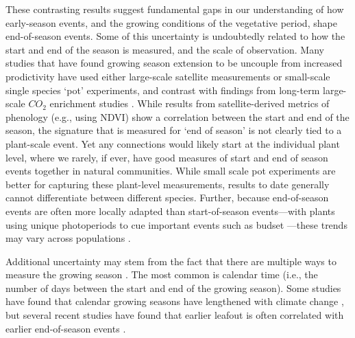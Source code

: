\documentclass{article}[12pt]
\begin{document}
These contrasting results suggest fundamental gaps in our understanding of how early-season events, and the growing conditions of the vegetative period, shape end-of-season events. Some of this uncertainty is undoubtedly related to how the start and end of the season is measured, and the scale of observation. Many studies that have found growing season extension to be uncouple from increased prodictivity have used either large-scale satellite measurements or small-scale single species `pot' experiments, and contrast with findings from long-term large-scale $CO_2$ enrichment studies \citep{norby2021comment}. While results from satellite-derived metrics of phenology (e.g., using NDVI) show a correlation between the start and end of the season, the signature that is measured for `end of season' is not clearly tied to a plant-scale event. Yet any connections would likely start at the individual plant level, where we rarely, if ever, have good measures of start and end of season events together in natural communities. While small scale pot experiments are better for capturing these plant-level measurements, results to date generally cannot differentiate between different species. Further, because end-of-season events are often more locally adapted than start-of-season events---with plants using unique photoperiods to cue important events such as budset \citep{bauerle2012photoperiodic,soolanayakanahally2013timing}---these trends may vary across populations \citep{aitken2016}.

Additional uncertainty may stem from the fact that there are multiple ways to measure the growing season \citep{Korner2023}. The most common is calendar time (i.e., the number of days between the start and end of the growing season). Some studies have found that calendar growing seasons have lengthened with climate change \citep{Menzel1999,Liu2010}, but several recent studies have found that earlier leafout is often correlated with earlier end-of-season events \citep{Zani2020,Liu2016,Keenan2015}. %
\end{document}
